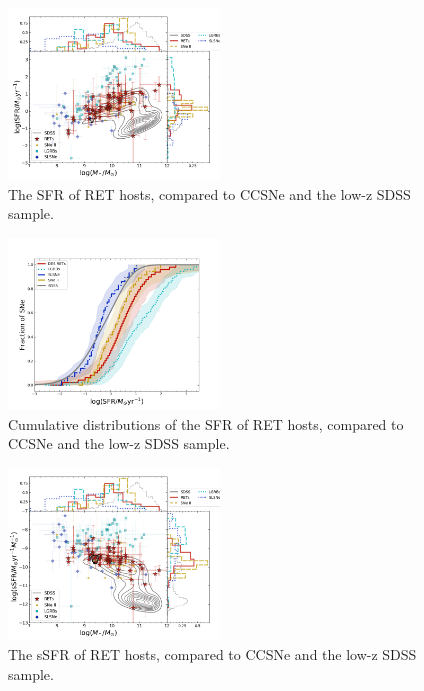 \documentclass[fleqn,usenatbib,]{mnras}
\begin{document}
\begin{figure}
\includegraphics[width=0.5\textwidth]{figs/SFR_Mike.png}
\caption{The SFR of RET hosts, compared to CCSNe and the low-z SDSS sample.
\label{fig:sfms_sfr}}
\end{figure}

\begin{figure}
\includegraphics[width=0.5\textwidth]{figs/cum_SFR_mike.png}
\caption{Cumulative distributions of the SFR of RET hosts, compared to CCSNe and the low-z SDSS sample.
\label{fig:sfr_cum}}
\end{figure}

\begin{figure}
\includegraphics[width=0.5\textwidth]{figs/sSFR_Mike.png}
\caption{The sSFR of RET hosts, compared to CCSNe and the low-z SDSS sample.
\label{fig:sfms_ssfr}}
\end{figure}
\end{document}
